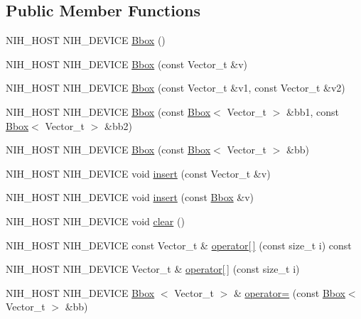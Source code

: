 \subsection*{\-Public \-Member \-Functions}
\begin{DoxyCompactItemize}
\item 
\-N\-I\-H\-\_\-\-H\-O\-S\-T \-N\-I\-H\-\_\-\-D\-E\-V\-I\-C\-E \hyperlink{structnih_1_1_bbox_ac674f03e9e984723f2398447391e0807}{\-Bbox} ()
\item 
\-N\-I\-H\-\_\-\-H\-O\-S\-T \-N\-I\-H\-\_\-\-D\-E\-V\-I\-C\-E \hyperlink{structnih_1_1_bbox_ad92cdc222bbd3f5cd5f67f09604eaedc}{\-Bbox} (const \-Vector\-\_\-t \&v)
\item 
\-N\-I\-H\-\_\-\-H\-O\-S\-T \-N\-I\-H\-\_\-\-D\-E\-V\-I\-C\-E \hyperlink{structnih_1_1_bbox_a75c9f074a52e3c0acbc5f747c6999df7}{\-Bbox} (const \-Vector\-\_\-t \&v1, const \-Vector\-\_\-t \&v2)
\item 
\-N\-I\-H\-\_\-\-H\-O\-S\-T \-N\-I\-H\-\_\-\-D\-E\-V\-I\-C\-E \hyperlink{structnih_1_1_bbox_a0512a9e8597c575f8b39d7d50d4a088d}{\-Bbox} (const \hyperlink{structnih_1_1_bbox}{\-Bbox}$<$ \-Vector\-\_\-t $>$ \&bb1, const \hyperlink{structnih_1_1_bbox}{\-Bbox}$<$ \-Vector\-\_\-t $>$ \&bb2)
\item 
\-N\-I\-H\-\_\-\-H\-O\-S\-T \-N\-I\-H\-\_\-\-D\-E\-V\-I\-C\-E \hyperlink{structnih_1_1_bbox_a256898f0ab2b2648ea785db9cd47c562}{\-Bbox} (const \hyperlink{structnih_1_1_bbox}{\-Bbox}$<$ \-Vector\-\_\-t $>$ \&bb)
\item 
\-N\-I\-H\-\_\-\-H\-O\-S\-T \-N\-I\-H\-\_\-\-D\-E\-V\-I\-C\-E void \hyperlink{structnih_1_1_bbox_aaf285b037bc220098333d91de589d010}{insert} (const \-Vector\-\_\-t \&v)
\item 
\-N\-I\-H\-\_\-\-H\-O\-S\-T \-N\-I\-H\-\_\-\-D\-E\-V\-I\-C\-E void \hyperlink{structnih_1_1_bbox_a250b720b5c23e3f4e3757d052c0beb67}{insert} (const \hyperlink{structnih_1_1_bbox}{\-Bbox} \&v)
\item 
\-N\-I\-H\-\_\-\-H\-O\-S\-T \-N\-I\-H\-\_\-\-D\-E\-V\-I\-C\-E void \hyperlink{structnih_1_1_bbox_a0908567fff19b639c7d6e875acbef265}{clear} ()
\item 
\-N\-I\-H\-\_\-\-H\-O\-S\-T \-N\-I\-H\-\_\-\-D\-E\-V\-I\-C\-E const \*
\-Vector\-\_\-t \& \hyperlink{structnih_1_1_bbox_a773d6d63c51cfc017aa0da640a5f9373}{operator\mbox{[}$\,$\mbox{]}} (const size\-\_\-t i) const 
\item 
\-N\-I\-H\-\_\-\-H\-O\-S\-T \-N\-I\-H\-\_\-\-D\-E\-V\-I\-C\-E \-Vector\-\_\-t \& \hyperlink{structnih_1_1_bbox_a561f0308c267706fe7460ee916c52037}{operator\mbox{[}$\,$\mbox{]}} (const size\-\_\-t i)
\item 
\-N\-I\-H\-\_\-\-H\-O\-S\-T \-N\-I\-H\-\_\-\-D\-E\-V\-I\-C\-E \hyperlink{structnih_1_1_bbox}{\-Bbox}\*
$<$ \-Vector\-\_\-t $>$ \& \hyperlink{structnih_1_1_bbox_a73597545739fe5df476167b616ffc247}{operator=} (const \hyperlink{structnih_1_1_bbox}{\-Bbox}$<$ \-Vector\-\_\-t $>$ \&bb)
\end{DoxyCompactItemize}
